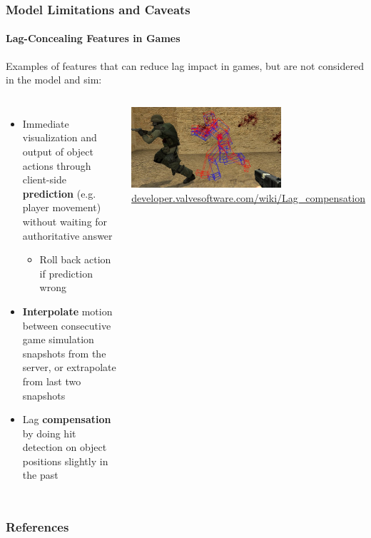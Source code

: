 \documentclass{UDEbeamerEN}
\begin{document}
\begin{frame}
	\frametitle{Model Limitations and Caveats}
	\framesubtitle{Lag-Concealing Features in Games}

	Examples of features that can reduce lag impact in games, but are not considered in the model and sim:

	\begin{columns}[T]
			\begin{itemize}
				\item Immediate visualization and output  of object actions through client-side \textbf{prediction} (e.g. player movement) without waiting for authoritative answer
				\begin{itemize}
					\item Roll back action if prediction wrong
				\end{itemize}

				\item \textbf{Interpolate} motion between consecutive game simulation snapshots from the server, or extrapolate from last two snapshots

				\item Lag \textbf{compensation} by doing hit detection on object positions slightly in the past
			\end{itemize}
			\includegraphics[height=3cm]{Lag_compensation.jpg}\\
			{\tiny\url{developer.valvesoftware.com/wiki/Lag_compensation}}
	\end{columns}

\end{frame}



\begin{frame}[allowframebreaks]
	\frametitle{References}

	\nocite{metzger2016gamesframes,5976180,4591393,4604397,6614351,mollertowards,Claypool:2006:LPA:1167838.1167860,1266180,claypool2007,Bredel:2010:MSR:1944796.1944797,Ivkovic:2015:QMN:2702123.2702432,Ware:1994:ROV:198425.198426,wertheimer1912experimentelle}
	\printbibliography[heading=none, title=none]

\end{frame}

\setcounter{framenumber}{\value{finalframe}}
\end{document}
